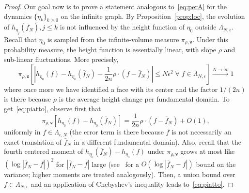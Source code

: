 \documentclass[10pt]{amsart}
\theoremstyle{definition}\newtheorem{defi}[theo]{Definition}\newtheorem{rema}[theo]{Remark}\newtheorem{exam}[theo]{Example}\newtheorem{exem}[theo]{Example}\newtheorem{nota}[theo]{Notation}
\newcommand{\ttw}{\mathtt{w}}
\let\oldforall\forall
\renewcommand*{\forall}{\mathrel{\oldforall}}
\begin{document}
\begin{proof}
Our goal now is to prove a statement analogous to~\eqref{eq:perA} for the dynamics $\{\eta_k\}_{k\ge0}$ on the infinite graph. By Proposition~\ref{prop:loc}, the evolution of $h_{\eta_j}(\bar f_N),j\le k$ is not influenced by the height function of $\eta_0$ outside $\Lambda_{N,\epsilon}$. Recall that $\eta_0$ is sampled from the infinite-volume measure $\pi_{\rho,\ttw}$. Under this probability measure, the height function is essentially linear, with slope $\rho$ and sub-linear fluctuations. More precisely,
\begin{equation}\label{eq:piatto}
\pi_{\rho,\ttw}\left[\left|h_{\eta_0}(f)-h_{\eta_0}(\bar f_N)-\frac1{2n}\rho\cdot(f-\bar f_N)\right|\le N\epsilon^2 \;\forall\;f\in \Lambda_{N,\epsilon}\right]\stackrel{N\to\infty}\to1
\end{equation}
where once more we have identified a face with its center and the factor $1/(2n)$ is there because $\rho$ is the average height change per fundamental domain. To get~\eqref{eq:piatto}, observe first that
\[
\pi_{\rho,\ttw}\left[h_{\eta_0}(f)-h_{\eta_0}(\bar f_N)\right]=\frac1{2n}\rho\cdot(f-\bar f_N)+O(1),
\]
uniformly in $f\in\Lambda_{\epsilon,N}$ (the error term is there because $f$ is not necessarily an exact translation of $\bar f_N$ in a different fundamental domain). Also, recall that the fourth centered moment of $h_{\eta_0}(\bar f_N)-h_{\eta_0}(f)$ under $ \pi_{\rho,\ttw}$ grows at most like $(\log|\bar f_N-f|)^{2}$ for $|\bar f_N-f|$ large (see~\cite[Section~4]{KOS03} for a $O(\log|\bar f_N-f|)$ bound on the variance; higher moments are treated analogously). Then, a union bound over $f\in \Lambda_{N,\epsilon}$ and an application of Chebyshev's inequality leads to~\eqref{eq:piatto}.


\end{proof}
\end{document}
